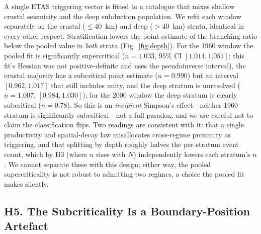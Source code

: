 A single ETAS triggering vector is fitted to a catalogue that mixes shallow crustal
seismicity and the deep subduction population. We refit each window separately on
the crustal ($\le40$~km) and deep ($>40$~km) strata, identical in every other
respect. Stratification lowers the point estimate of the branching ratio below the
pooled value in \emph{both} strata (Fig.~\ref{fig:depth}). For the 1960 window the
pooled fit is significantly supercritical ($n=1.033$, 95\% CI $[1.014,1.051]$;
this fit's Hessian was not positive-definite and uses the pseudoinverse interval),
the crustal majority has a subcritical point estimate ($n=0.990$) but an interval
$[0.962,1.017]$ that still includes unity, and the deep stratum is unresolved
($n=1.007$, $[0.984,1.030]$); for the 2000 window the deep stratum is clearly
subcritical ($n=0.78$). So this is an \emph{incipient} Simpson's effect---neither
1960 stratum is significantly subcritical---not a full paradox, and we are careful
not to claim the classification flips. Two readings are consistent with it: that a
single productivity and spatial-decay law misallocates cross-regime proximity as
triggering, and that splitting by depth roughly halves the per-stratum event count,
which by H3 (where $n$ rises with $N$) independently lowers each stratum's $n$. We
cannot separate these with this design; either way, the pooled supercriticality is
not robust to admitting two regimes, a choice the pooled fit makes silently.

\subsection*{H5. The Subcriticality Is a Boundary-Position Artefact}


